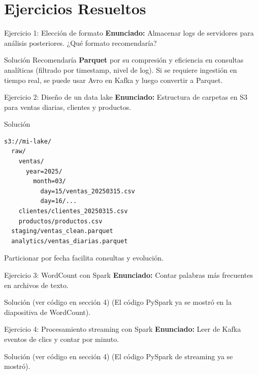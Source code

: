 \documentclass[aspectratio=169, 10pt, xcolor=table]{beamer}
\begin{document}
\section{Ejercicios Resueltos}

\begin{frame}{Ejercicio 1: Elección de formato}
    \textbf{Enunciado:} Almacenar logs de servidores para análisis posteriores. ¿Qué formato recomendaría?
    \begin{block}{Solución}
        Recomendaría \textbf{Parquet} por su compresión y eficiencia en consultas analíticas (filtrado por timestamp, nivel de log). Si se requiere ingestión en tiempo real, se puede usar Avro en Kafka y luego convertir a Parquet.
    \end{block}
\end{frame}

\begin{frame}[fragile]{Ejercicio 2: Diseño de un data lake}
    \textbf{Enunciado:} Estructura de carpetas en S3 para ventas diarias, clientes y productos.
    \begin{block}{Solución}
        \begin{verbatim}
s3://mi-lake/
  raw/
    ventas/
      year=2025/
        month=03/
          day=15/ventas_20250315.csv
          day=16/...
    clientes/clientes_20250315.csv
    productos/productos.csv
  staging/ventas_clean.parquet
  analytics/ventas_diarias.parquet
        \end{verbatim}
        Particionar por fecha facilita consultas y evolución.
    \end{block}
\end{frame}

\begin{frame}[fragile]{Ejercicio 3: WordCount con Spark}
    \textbf{Enunciado:} Contar palabras más frecuentes en archivos de texto.
    \begin{block}{Solución (ver código en sección 4)}
        (El código PySpark ya se mostró en la diapositiva de WordCount).
    \end{block}
\end{frame}

\begin{frame}[fragile]{Ejercicio 4: Procesamiento streaming con Spark}
    \textbf{Enunciado:} Leer de Kafka eventos de clics y contar por minuto.
    \begin{block}{Solución (ver código en sección 4)}
        (El código PySpark de streaming ya se mostró).
    \end{block}
\end{frame}
\end{document}

